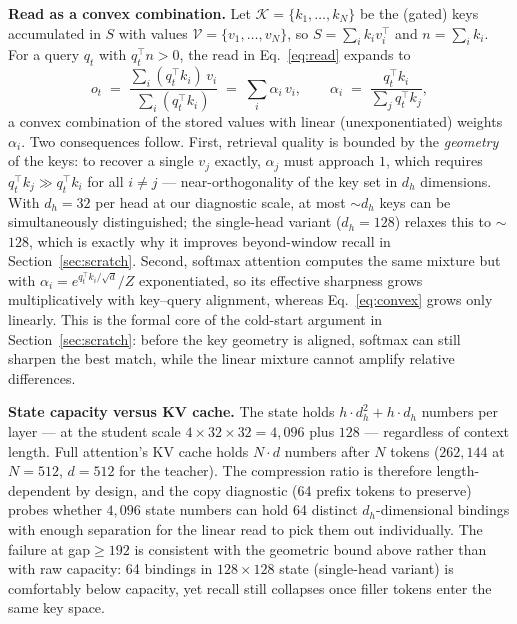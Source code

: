 \documentclass[11pt]{article}
\begin{document}
\textbf{Read as a convex combination.} Let $\mathcal{K} = \{k_1, \dots, k_N\}$ be the
(gated) keys accumulated in $S$ with values $\mathcal{V} = \{v_1, \dots, v_N\}$, so
$S = \sum_i k_i v_i^{\top}$ and $n = \sum_i k_i$. For a query $q_t$ with
$q_t^{\top} n > 0$, the read in Eq.~\eqref{eq:read} expands to
\begin{equation}
o_t \;=\; \frac{\sum_i (q_t^{\top} k_i)\, v_i}{\sum_i (q_t^{\top} k_i)}
\;=\; \sum_i \alpha_i\, v_i, \qquad \alpha_i \;=\; \frac{q_t^{\top} k_i}{\sum_j q_t^{\top} k_j},
\label{eq:convex}
\end{equation}
a convex combination of the stored values with linear (unexponentiated) weights
$\alpha_i$. Two consequences follow. First, retrieval quality is bounded by the
\emph{geometry} of the keys: to recover a single $v_j$ exactly, $\alpha_j$ must approach
$1$, which requires $q_t^{\top} k_j \gg q_t^{\top} k_i$ for all $i \neq j$ --- near-orthogonality
of the key set in $d_h$ dimensions. With $d_h = 32$ per head at our diagnostic scale, at
most $\sim$$d_h$ keys can be simultaneously distinguished; the
single-head variant ($d_h{=}128$) relaxes this to $\sim$$128$, which is exactly why it
improves beyond-window recall in Section~\ref{sec:scratch}. Second, softmax attention
computes the same mixture but with $\alpha_i = e^{q_t^{\top} k_i / \sqrt{d}}/Z$
exponentiated, so its effective sharpness grows multiplicatively with key--query
alignment, whereas Eq.~\eqref{eq:convex} grows only linearly. This is the formal core of
the cold-start argument in Section~\ref{sec:scratch}: before the key geometry is
aligned, softmax can still sharpen the best match, while the linear mixture cannot
amplify relative differences.

\textbf{State capacity versus KV cache.} The state holds $h \cdot d_h^2 + h \cdot d_h$
numbers per layer --- at the student scale $4 \times 32 \times 32 = 4{,}096$ plus
$128$ --- regardless of context length. Full attention's KV cache holds $N \cdot d$
numbers after $N$ tokens ($262{,}144$ at $N{=}512$, $d{=}512$ for the teacher). The
compression ratio is therefore length-dependent by design, and the copy diagnostic
(64 prefix tokens to preserve) probes whether $4{,}096$ state numbers can hold 64
distinct $d_h$-dimensional bindings with enough separation for the linear read to pick
them out individually. The failure at gap${\ge}192$ is consistent with the geometric
bound above rather than with raw capacity: 64 bindings in $128{\times}128$ state
(single-head variant) is comfortably below capacity, yet recall still collapses once
filler tokens enter the same key space.
\end{document}
